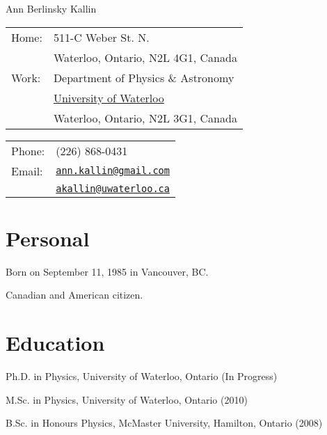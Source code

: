 \documentclass[letterpaper]{article}
\def\name{Ann Berlinsky Kallin}
\renewenvironment{itemize}{
  \begin{list}{}{
    \setlength{\leftmargin}{1.5em}
  }
}{
  \end{list}
}
\begin{document}
{\huge \name}


\vspace{0.25in}

\begin{minipage}[t]{0.5\linewidth}
 \begin{tabular}{ll}
   Home: & 511-C Weber St. N.\\
  \vspace{0.1in}
 & Waterloo, Ontario, N2L 4G1, Canada\\ 
  Work: & Department of Physics \& Astronomy \\
  & \href{http://uwaterloo.ca/}{University of Waterloo} \\
  & Waterloo, Ontario, N2L 3G1, Canada
  \end{tabular}
\end{minipage}
\begin{minipage}[t]{0.45\linewidth}
  \begin{tabular}{ll}
  \vspace{0.1in}
    Phone: & (226) 868-0431 \\
    Email: & \href{mailto:ann.kallin@gmail.com}{\tt ann.kallin@gmail.com} \\
                & \href{mailto:akallin@uwaterloo.ca}{\tt akallin@uwaterloo.ca}
  \end{tabular}
\end{minipage}


\section*{Personal}

\begin{itemize}
\item Born on September 11, 1985 in Vancouver, BC.
\item Canadian and American citizen.
\end{itemize}


\section*{Education}

\begin{itemize}
	\item Ph.D. in Physics, University of Waterloo, Ontario (In Progress)
  	\item M.Sc. in Physics, University of Waterloo, Ontario (2010)
	\item B.Sc. in Honours Physics, McMaster University, Hamilton, Ontario (2008)
\end{itemize}
\end{document}
